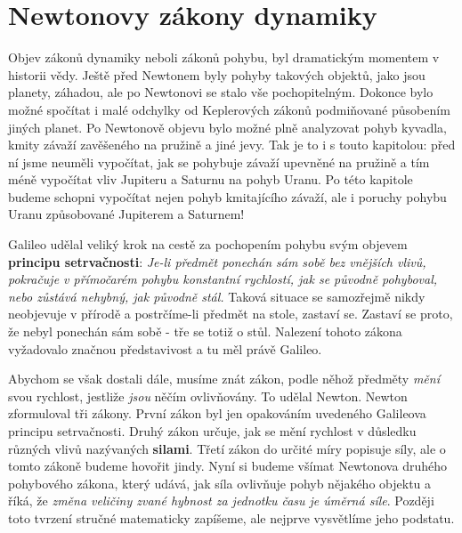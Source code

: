 \chapter{Newtonovy zákony dynamiky}\label{fyz:IchapIX}
\minitoc
    Objev zákonů dynamiky neboli zákonů pohybu, byl dramatickým momentem v historii vědy. Ještě 
    před Newtonem byly pohyby takových objektů, jako jsou planety, záhadou, ale po Newtonovi se 
    stalo vše pochopitelným. Dokonce bylo možné spočítat i malé odchylky od Keplerových zákonů 
    podmiňované působením jiných planet. Po Newtonově objevu bylo možné plně analyzovat pohyb 
    kyvadla, kmity závaží zavěšeného na pružině a jiné jevy. Tak je to i s touto kapitolou: před ní 
    jsme neuměli vypočítat, jak se pohybuje závaží upevněné na pružině a tím méně vypočítat vliv 
    Jupiteru a Saturnu na pohyb Uranu. Po této kapitole budeme schopni vypočítat nejen pohyb 
    kmitajícího závaží, ale i poruchy pohybu Uranu způsobované Jupiterem a Saturnem!
    
    Galileo udělal veliký krok na cestě za pochopením pohybu svým objevem \textbf{principu 
    setrvačnosti}: \emph{Je-li předmět ponechán sám sobě bez vnějších vlivů, pokračuje v přímočarém 
    pohybu konstantní rychlostí, jak se původně pohyboval, nebo zůstává nehybný, jak původně stál.} 
    Taková situace se samozřejmě nikdy neobjevuje v přírodě a postrčíme-li předmět na stole, 
    zastaví se. Zastaví se proto, že nebyl ponechán sám sobě - tře se totiž o stůl. Nalezení tohoto 
    zákona vyžadovalo značnou představivost a tu měl právě Galileo.
    
    Abychom se však dostali dále, musíme znát zákon, podle něhož předměty \emph{mění} svou 
    rychlost, jestliže \emph{jsou} něčím ovlivňovány. To udělal Newton. Newton zformuloval tři 
    zákony. První zákon byl jen opakováním uvedeného Galileova principu setrvačnosti. Druhý zákon 
    určuje, jak se mění rychlost v důsledku různých vlivů nazývaných \textbf{silami}. Třetí zákon 
    do určité míry popisuje síly, ale o tomto zákoně budeme hovořit jindy. Nyní si budeme všímat 
    Newtonova druhého pohybového zákona, který udává, jak síla ovlivňuje pohyb nějakého objektu a 
    říká, že \emph{změna veličiny zvané hybnost za jednotku času je úměrná síle}. Později toto 
    tvrzení stručné matematicky zapíšeme, ale nejprve vysvětlíme jeho podstatu.
    
